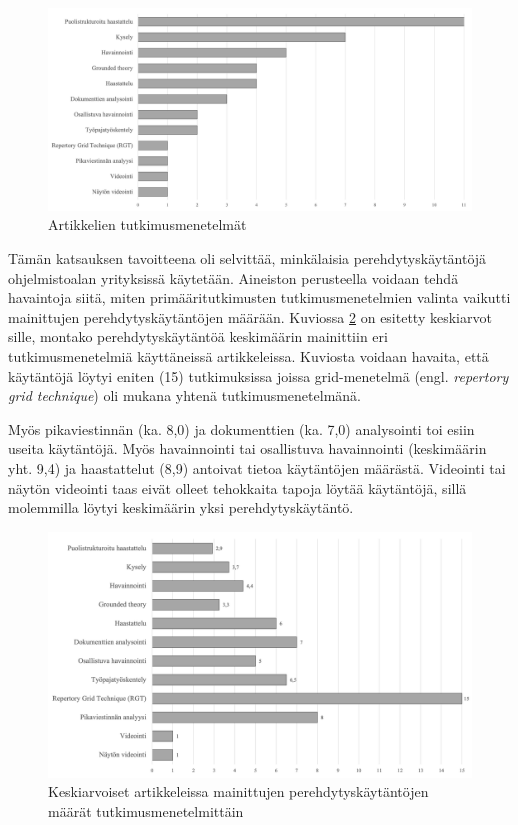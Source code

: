 \documentclass[utf8]{gradu3}
\begin{document}
\begin{figure}[h]
    \centering
    \includegraphics[width=\textwidth]{media/menetelmat.png}
    \caption{Artikkelien tutkimusmenetelmät}
    \label{kuvio:tutkimusmenetelmat}
\end{figure}

Tämän katsauksen tavoitteena oli selvittää, minkälaisia perehdytyskäytäntöjä ohjelmistoalan yrityksissä käytetään. Aineiston perusteella voidaan tehdä havaintoja siitä, miten primääritutkimusten tutkimusmenetelmien valinta vaikutti mainittujen perehdytyskäytäntöjen määrään. Kuviossa \ref{kuvio:menetelmilla-havaitut-kaytannot} on esitetty keskiarvot sille, montako perehdytyskäytäntöä keskimäärin mainittiin eri tutkimusmenetelmiä käyttäneissä artikkeleissa. Kuviosta voidaan havaita, että käytäntöjä löytyi eniten (15) tutkimuksissa joissa grid-menetelmä (engl. \textit{repertory grid technique}) oli mukana yhtenä tutkimusmenetelmänä.

Myös pikaviestinnän (ka. 8,0) ja dokumenttien (ka. 7,0) analysointi toi esiin useita käytäntöjä. Myös havainnointi tai osallistuva havainnointi (keskimäärin yht. 9,4) ja haastattelut (8,9) antoivat tietoa käytäntöjen määrästä. Videointi tai näytön videointi taas eivät olleet tehokkaita tapoja löytää käytäntöjä, sillä molemmilla löytyi keskimäärin yksi perehdytyskäytäntö.

\begin{figure}[h]
    \centering
    \includegraphics[width=\textwidth]{media/menetelmilla-havaitut-kaytannot.png}
    \caption{Keskiarvoiset artikkeleissa mainittujen perehdytyskäytäntöjen määrät tutkimusmenetelmittäin}
    \label{kuvio:menetelmilla-havaitut-kaytannot}
\end{figure}
\end{document}
